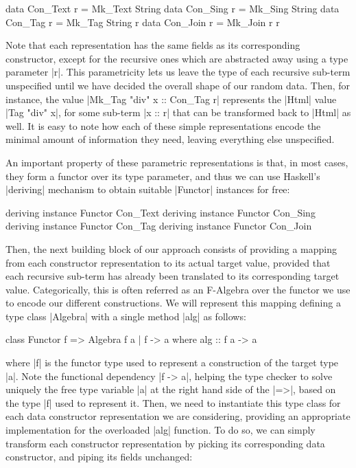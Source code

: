 \begin{code}
data Con_Text   r = Mk_Text  String
data Con_Sing   r = Mk_Sing  String
data Con_Tag    r = Mk_Tag   String r
data Con_Join   r = Mk_Join  r r
\end{code}
%
Note that each representation has the same fields as its corresponding
constructor, except for the recursive ones which are abstracted away using a
type parameter |r|.
%
This parametricity lets us leave the type of each recursive sub-term unspecified
until we have decided the overall shape of our random data.
%
Then, for instance, the value |Mk_Tag "div" x :: Con_Tag r| represents the
|Html| value |Tag "div" x|, for some sub-term |x :: r| that can be transformed
back to |Html| as well.
%
It is easy to note how each of these simple representations encode the minimal
amount of information they need, leaving everything else unspecified.

An important property of these parametric representations is that, in most
cases, they form a functor over its type parameter, and thus we can use
Haskell's |deriving| mechanism to obtain suitable |Functor| instances for free:

\begin{code}
deriving instance Functor Con_Text
deriving instance Functor Con_Sing
deriving instance Functor Con_Tag
deriving instance Functor Con_Join
\end{code}


%
Then, the next building block of our approach consists of providing a mapping
from each constructor representation to its actual target value, provided that
each recursive sub-term has already been translated to its corresponding target
value.
%
Categorically, this is often referred as an F-Algebra over the functor we use to
encode our different constructions.
%
We will represent this mapping defining a type class |Algebra| with a single
method |alg| as follows:

\begin{code}
class Functor f => Algebra f a | f -> a where
  alg :: f a -> a
\end{code}
%
where |f| is the functor type used to represent a construction of the target
type |a|.
%
Note the functional dependency |f -> a|, helping the type checker to solve
uniquely the free type variable |a| at the right hand side of the |=>|, based on
the type |f| used to represent it.
%
%
Then, we need to instantiate this type class for each data constructor
representation we are considering, providing an appropriate implementation for
the overloaded |alg| function.
%
To do so, we can simply transform each constructor representation by picking its
corresponding data constructor, and piping its fields unchanged:

